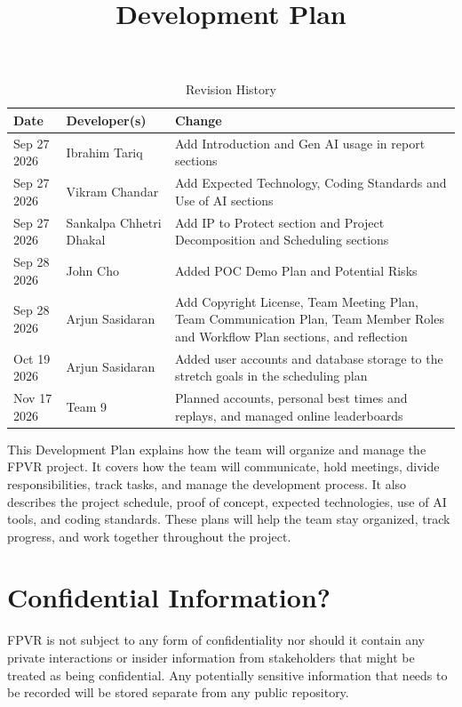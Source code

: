 \documentclass{article}
\title{Development Plan\\\progname}
\author{\authname}
\date{}
\begin{document}
\maketitle

\begin{table}[hp]
\caption{Revision History} \label{TblRevisionHistory}
\begin{tabularx}{\textwidth}{llX}
\toprule
\textbf{Date} & \textbf{Developer(s)} & \textbf{Change}\\
\midrule
Sep 27 2026 & Ibrahim Tariq & Add Introduction and Gen AI usage in report sections\\
Sep 27 2026 & Vikram Chandar & Add Expected Technology, Coding Standards and Use of AI sections\\
Sep 27 2026 & Sankalpa Chhetri Dhakal & Add IP to Protect section and Project Decomposition and Scheduling sections\\
Sep 28 2026 & John Cho & Added POC Demo Plan and Potential Risks\\
Sep 28 2026 & Arjun Sasidaran & Add Copyright License, Team Meeting Plan, Team Communication Plan, Team Member Roles and Workflow Plan sections, and reflection\\
Oct 19 2026 & Arjun Sasidaran & Added user accounts and database storage to the stretch goals in the scheduling plan\\
Nov 17 2026 & Team 9 & Planned accounts, personal best times and replays, and managed online leaderboards\\
\bottomrule
\end{tabularx}
\end{table}

\newpage{}

This Development Plan explains how the team will organize and manage the FPVR project. 
It covers how the team will communicate, hold meetings, divide responsibilities, track 
tasks, and manage the development process. It also describes the project schedule, proof
of concept, expected technologies, use of AI tools, and coding standards. These plans 
will help the team stay organized, track progress, and work together throughout the project.

\section{Confidential Information?}

FPVR is not subject to any form of confidentiality nor should it contain any private 
interactions or insider information from stakeholders that might be treated as 
being confidential. Any potentially sensitive information that needs to be recorded
will be stored separate from any public repository.
\end{document}
